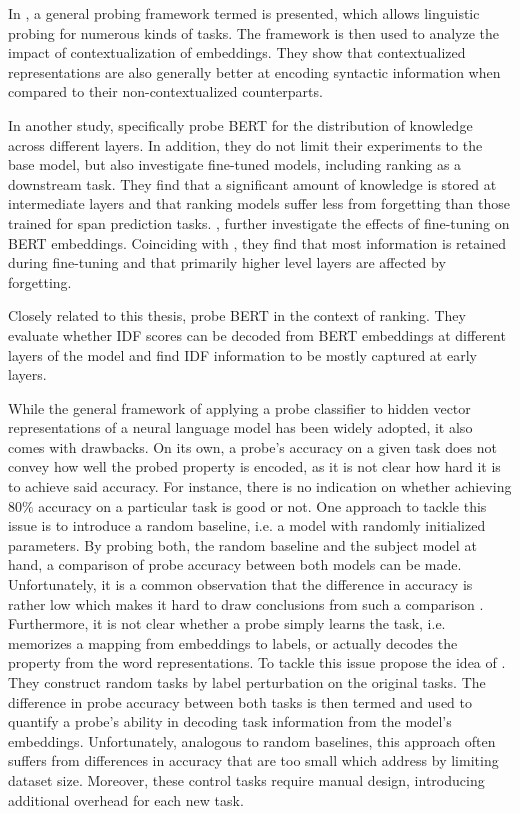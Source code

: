In \citep{Tenney2019WhatDY}, a general probing framework termed  is presented, which allows linguistic probing for numerous kinds of tasks. The framework is then used to analyze the impact of contextualization of embeddings. They show that contextualized representations are also generally better at encoding syntactic information when compared to their non-contextualized counterparts.

In another study, \citet{singh-etal-2020-bertnesia} specifically probe BERT for the distribution of knowledge across different layers. In addition, they do not limit their experiments to the base model, but also investigate fine-tuned models, including ranking as a downstream task. They find that a significant amount of knowledge is stored at intermediate layers and that ranking models suffer less from forgetting than those trained for span prediction tasks. \citet{merchant-etal-2020-happens}, further investigate the effects of fine-tuning on BERT embeddings. Coinciding with \citet{singh-etal-2020-bertnesia}, they find that most information is retained during fine-tuning and that primarily higher level layers are affected by forgetting.

Closely related to this thesis, \citet{https://doi.org/10.48550/arxiv.2202.12191} probe BERT in the context of ranking. They evaluate whether IDF scores can be decoded from BERT embeddings at different layers of the model and find IDF information to be mostly captured at early layers.

While the general framework of applying a probe classifier to hidden vector representations of a neural language model has been widely adopted, it also comes with drawbacks. On its own, a probe's accuracy on a given task does not convey how well the probed property is encoded, as it is not clear how hard it is to achieve said accuracy. For instance, there is no indication on whether achieving $80\%$ accuracy on a particular task is good or not.
One approach to tackle this issue is to introduce a random baseline, i.e. a model with randomly initialized parameters. By probing both, the random baseline and the subject model at hand, a comparison of probe accuracy between both models can be made. Unfortunately, it is a common observation that the difference in accuracy is rather low which makes it hard to draw conclusions from such a comparison \citep{zhang-bowman-2018-language}.
Furthermore, it is not clear whether a probe simply learns the task, i.e. memorizes a mapping from embeddings to labels, or actually decodes the property from the word representations. To tackle this issue \citet{hewitt-liang-2019-designing} propose the idea of . They construct random tasks by label perturbation on the original tasks. The difference in probe accuracy between both tasks is then termed  and used to quantify a probe's ability in decoding task information from the model's embeddings. Unfortunately, analogous to random baselines, this approach often suffers from differences in accuracy that are too small which \citet{hewitt-liang-2019-designing} address by limiting dataset size. Moreover, these control tasks require manual design, introducing additional overhead for each new task.

